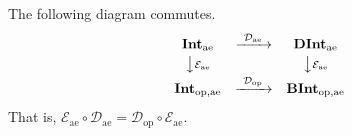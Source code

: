 \begin{proposition}\label{prop:E-commutes-with-D}
  The following diagram commutes.
  \[
    \begin{array}{ccc}
      \mathbf{Int}_{\mathrm{ae}}
        & \xrightarrow{\ \mathcal{D}_{\mathrm{ae}}\ }
        & \mathbf{DInt}_{\mathrm{ae}}\\[2pt]
      \big\downarrow{\scriptstyle\mathcal{E}_{\mathrm{ae}}}
        & & \big\downarrow{\scriptstyle\mathcal{E}_{\mathrm{ae}}}\\[2pt]
      \mathbf{Int}_{\mathrm{op},\mathrm{ae}}
        & \xrightarrow{\ \mathcal{D}_{\mathrm{op}}\ }
        & \mathbf{BInt}_{\mathrm{op},\mathrm{ae}}
    \end{array}
  \]
  That is,
  $\mathcal{E}_{\mathrm{ae}}\circ\mathcal{D}_{\mathrm{ae}}
  =\mathcal{D}_{\mathrm{op}}\circ\mathcal{E}_{\mathrm{ae}}$.
\end{proposition}
